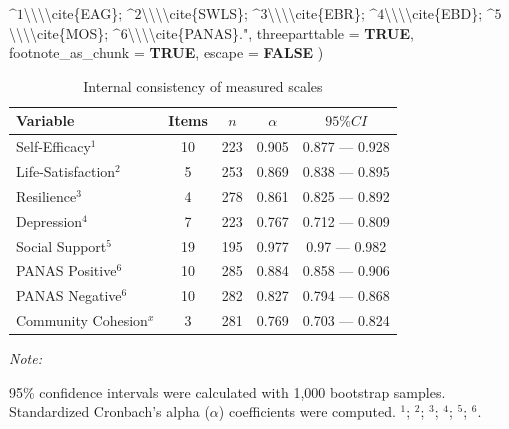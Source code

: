 \documentclass[
  bookmarksnumbered]{article}
\newenvironment{Shaded}{\begin{snugshade}}{\end{snugshade}}
\newcommand{\AttributeTok}[1]{\textcolor[rgb]{0.80,0.80,0.80}{#1}}
\newcommand{\ConstantTok}[1]{\textcolor[rgb]{0.86,0.64,0.64}{\textbf{#1}}}
\newcommand{\NormalTok}[1]{\textcolor[rgb]{0.80,0.80,0.80}{#1}}
\newcommand{\SpecialCharTok}[1]{\textcolor[rgb]{0.86,0.64,0.64}{#1}}
\newcommand{\StringTok}[1]{\textcolor[rgb]{0.80,0.58,0.58}{#1}}
\begin{document}
\begin{Shaded}
\begin{Highlighting}[]
\StringTok{           $\^{}1$}\SpecialCharTok{\textbackslash{}\textbackslash{}\textbackslash{}\textbackslash{}}\StringTok{cite\{EAG\};}
\StringTok{           $\^{}2$}\SpecialCharTok{\textbackslash{}\textbackslash{}\textbackslash{}\textbackslash{}}\StringTok{cite\{SWLS\};}
\StringTok{           $\^{}3$}\SpecialCharTok{\textbackslash{}\textbackslash{}\textbackslash{}\textbackslash{}}\StringTok{cite\{EBR\};}
\StringTok{           $\^{}4$}\SpecialCharTok{\textbackslash{}\textbackslash{}\textbackslash{}\textbackslash{}}\StringTok{cite\{EBD\};}
\StringTok{           $\^{}5$}\SpecialCharTok{\textbackslash{}\textbackslash{}\textbackslash{}\textbackslash{}}\StringTok{cite\{MOS\};}
\StringTok{           $\^{}6$}\SpecialCharTok{\textbackslash{}\textbackslash{}\textbackslash{}\textbackslash{}}\StringTok{cite\{PANAS\}."}\NormalTok{,}
    \AttributeTok{threeparttable =} \ConstantTok{TRUE}\NormalTok{, }\AttributeTok{footnote\_as\_chunk =} \ConstantTok{TRUE}\NormalTok{, }\AttributeTok{escape =} \ConstantTok{FALSE}
\NormalTok{  )}
\end{Highlighting}
\end{Shaded}

\begin{table}[H]
\centering
\caption{\label{tab:tab-cronbach-alpha}Internal consistency of measured scales}
\centering
\begin{threeparttable}
\begin{tabular}[t]{lcccc}
\toprule
Variable & Items & $n$ & $\alpha$ & $95\% CI$\\
\midrule
Self-Efficacy$^1$ & 10 & 223 & 0.905 & 0.877 — 0.928\\
Life-Satisfaction$^2$ & 5 & 253 & 0.869 & 0.838 — 0.895\\
Resilience$^3$ & 4 & 278 & 0.861 & 0.825 — 0.892\\
Depression$^4$ & 7 & 223 & 0.767 & 0.712 — 0.809\\
Social Support$^5$ & 19 & 195 & 0.977 & 0.97 — 0.982\\
PANAS Positive$^6$ & 10 & 285 & 0.884 & 0.858 — 0.906\\
PANAS Negative$^6$ & 10 & 282 & 0.827 & 0.794 — 0.868\\
Community Cohesion$^x$ & 3 & 281 & 0.769 & 0.703 — 0.824\\
\bottomrule
\end{tabular}
\begin{tablenotes}[para]
\item \textit{Note: } 
\item 95\% confidence intervals were calculated with 1,000 bootstrap samples.
           Standardized Cronbach's alpha ($\alpha$) coefficients were computed.
           $^1$\cite{EAG};
           $^2$\cite{SWLS};
           $^3$\cite{EBR};
           $^4$\cite{EBD};
           $^5$\cite{MOS};
           $^6$\cite{PANAS}.
\end{tablenotes}
\end{threeparttable}
\end{table}
\end{document}
